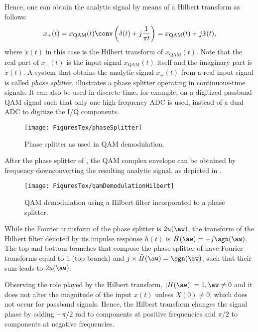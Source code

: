 Hence, one can obtain the analytic signal by means of a Hilbert transform 
as follows:
\[
x_{+}(t) = x_{\textrm{QAM}}(t) \conv \left(\delta(t) + j \frac 1 {\pi t} \right) = x_{\textrm{QAM}}(t) + j \check x(t),
\]
where $\check{x}(t)$ in this case is the Hilbert transform of $x_{\textrm{QAM}}(t)$.
Note that the real part of $x_{+}(t)$ is the input signal $x_{\textrm{QAM}}(t)$ itself and the imaginary part is $\check x(t)$. A system that obtains the analytic signal $x_{+}(t)$ from a real input signal is called \emph{phase splitter}.
 illustrates a phase splitter operating in continuous-time signals. It can also be used in discrete-time, for example, on a digitized passband QAM signal such that only one high-frequency ADC is used, instead of a dual ADC to digitize the I/Q components.

\begin{figure}[htbp]
	\centering
		\texttt{[image: FiguresTex/phaseSplitter]}		
	\caption{Phase splitter as used in QAM demodulation.\label{fig:phaseSplitter}}
\end{figure}

After the phase splitter of , the QAM complex envelope can be obtained by frequency downconverting the resulting analytic signal, as depicted in .

\begin{figure}[htbp]
	\centering
		\texttt{[image: FiguresTex/qamDemodulationHilbert]}		
	\caption{QAM demodulation using a Hilbert filter incorporated to a phase splitter.\label{fig:qamDemodulationHilbert}}
\end{figure}

While the Fourier transform of the phase splitter is $2u(\aw)$, the transform of the Hilbert filter denoted by its impulse response $\bar h(t)$ is $\bar H(\aw)=-j \sgn(\aw)$. 
The top and bottom branches that compose the phase splitter of  have 
Fourier transforms equal to 1 (top branch) and $j \times \bar H(\aw) = \sgn(\aw)$, such that their
sum leads to $2u(\aw)$.

Observing the role played by the Hilbert transform, $|\bar H(\aw)|=1, \aw \ne 0$ and it
does not alter the magnitude of the input $x(t)$ unless $X(0) \ne 0$, which does not occur for passband signals. 
Hence, the Hilbert transform changes the signal phase by adding $-\pi/2$ rad to components at positive frequencies and $\pi/2$ to components at negative frequencies.

